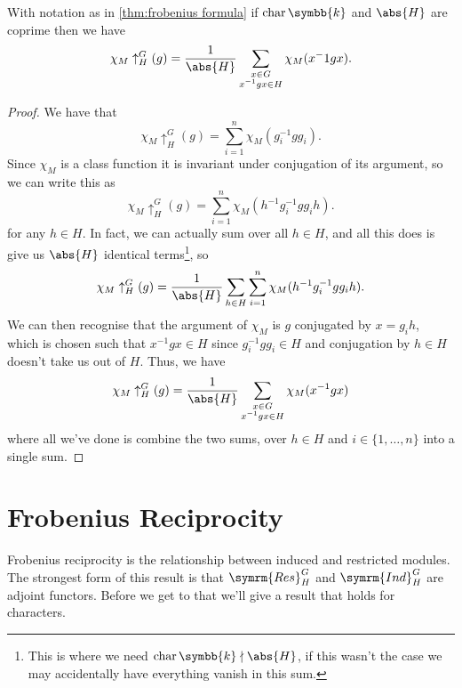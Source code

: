 \documentclass[fleqn]{NotesClass}
\renewcommand{\field}{\symbb{k}}
\DeclareMathOperator{\Char}{char}
\newcommand{\Res}{\symrm{Res}}
\newcommand{\Ind}{\symrm{Ind}}
\begin{document}
    \begin{crl}{}{}
        With notation as in \cref{thm:frobenius formula} if \(\Char \field\) and \(\abs{H}\) are coprime then we have
        \begin{equation}
            \chi_M\uparrow^G_H(g) = \frac{1}{\abs{H}} \sum_{\substack{x \in G\\ x^{-1}gx \in H}} \chi_M(x^-1 g x).
        \end{equation}
        \begin{proof}
            We have that
            \begin{equation}
                \chi_M\uparrow^G_H(g) = \sum_{i=1}^n \chi_M(g_i^{-1}gg_i).
            \end{equation}
            Since \(\chi_M\) is a class function it is invariant under conjugation of its argument, so we can write this as
            \begin{equation}
                \chi_M\uparrow^G_H(g) = \sum_{i=1}^n \chi_M(h^{-1}g_i^{-1}gg_ih).
            \end{equation}
            for any \(h \in H\).
            In fact, we can actually sum over all \(h \in H\), and all this does is give us \(\abs{H}\) identical terms\footnote{This is where we need \(\Char \field \nmid \abs{H}\), if this wasn't the case we may accidentally have everything vanish in this sum.}, so
            \begin{equation}
                \chi_M\uparrow^G_H(g) = \frac{1}{\abs{H}} \sum_{h \in H} \sum_{i=1}^n \chi_M(h^{-1}g_i^{-1}gg_ih).
            \end{equation}
            We can then recognise that the argument of \(\chi_M\) is \(g\) conjugated by \(x = g_i h\), which is chosen such that \(x^{-1}gx \in H\) since \(g_i^{-1}gg_i \in H\) and conjugation by \(h \in H\) doesn't take us out of \(H\).
            Thus, we have
            \begin{equation}
                \chi_M\uparrow^G_H(g) = \frac{1}{\abs{H}} \sum_{\substack{x \in G\\ x^{-1}gx \in H}} \chi_M(x^{-1}gx)
            \end{equation}
            where all we've done is combine the two sums, over \(h \in H\) and \(i \in \{1, \dotsc, n\}\) into a single sum.
        \end{proof}
    \end{crl}
    
    \section{Frobenius Reciprocity}
    Frobenius reciprocity is the relationship between induced and restricted modules.
    The strongest form of this result is that \(\Res^G_H\) and \(\Ind^G_H\) are adjoint functors.
    Before we get to that we'll give a result that holds for characters.
    
\end{document}
